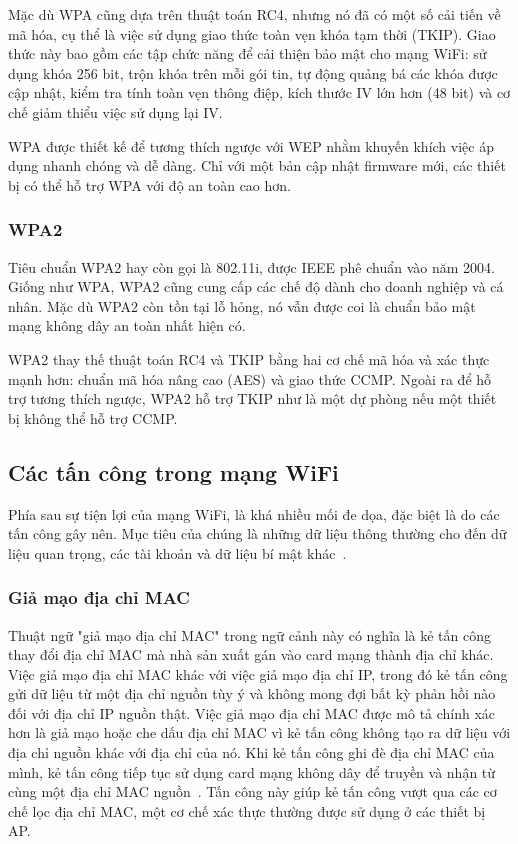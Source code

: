 Mặc dù WPA cũng dựa trên thuật toán RC4, nhưng nó đã có một số cải tiến về mã hóa, cụ thể là việc sử dụng giao thức toàn vẹn khóa tạm thời (TKIP). Giao thức này bao gồm các tập chức năng để cải thiện bảo mật cho mạng WiFi: sử dụng khóa 256 bit, trộn khóa trên mỗi gói tin, tự động quảng bá các khóa được cập nhật, kiểm tra tính toàn vẹn thông điệp, kích thước IV lớn hơn (48 bit) và cơ chế giảm thiểu việc sử dụng lại IV.

WPA được thiết kế để tương thích ngược với WEP nhằm khuyến khích việc áp dụng nhanh chóng và dễ dàng. Chỉ với một bản cập nhật firmware mới, các thiết bị có thể hỗ trợ WPA với độ an toàn cao hơn.

\subsubsection{WPA2}
Tiêu chuẩn WPA2 hay còn gọi là 802.11i, được IEEE phê chuẩn vào năm 2004. Giống như WPA, WPA2 cũng cung cấp các chế độ dành cho doanh nghiệp và cá nhân. Mặc dù WPA2 còn tồn tại lỗ hỏng, nó vẫn được coi là chuẩn bảo mật mạng không dây an toàn nhất hiện có.

WPA2 thay thế thuật toán RC4 và TKIP bằng hai cơ chế mã hóa và xác thực mạnh hơn: chuẩn mã hóa nâng cao (AES) và giao thức CCMP. Ngoài ra để hỗ trợ tương thích ngược, WPA2 hỗ trợ TKIP như là một dự phòng nếu một thiết bị không thể hỗ trợ CCMP.

\subsection{Các tấn công trong mạng WiFi}
Phía sau sự tiện lợi của mạng WiFi, là khá nhiều mối đe dọa, đặc biệt là do các tấn công gây nên. Mục tiêu của chúng là những dữ liệu thông thường cho đến dữ liệu quan trọng, các tài khoản và dữ liệu bí mật khác~\cite{MEKHAZNIA2015172}.

\subsubsection{Giả mạo địa chỉ MAC}
Thuật ngữ "giả mạo địa chỉ MAC" trong ngữ cảnh này có nghĩa là kẻ tấn công thay đổi địa chỉ MAC mà nhà sản xuất gán vào card mạng thành địa chỉ khác. Việc giả mạo địa chỉ MAC khác với việc giả mạo địa chỉ IP, trong đó kẻ tấn công gửi dữ liệu từ một địa chỉ nguồn tùy ý và không mong đợi bất kỳ phản hồi nào đối với địa chỉ IP nguồn thật. Việc giả mạo địa chỉ MAC được mô tả chính xác hơn là giả mạo hoặc che dấu địa chỉ MAC vì kẻ tấn công không tạo ra dữ liệu với địa chỉ nguồn khác với địa chỉ của nó. Khi kẻ tấn công ghi đè địa chỉ MAC của mình, kẻ tấn công tiếp tục sử dụng card mạng không dây để truyền và nhận từ cùng một địa chỉ MAC nguồn~\cite{joshua2003detecting}. Tấn công này giúp kẻ tấn công vượt qua các cơ chế lọc địa chỉ MAC, một cơ chế xác thực thường được sử dụng ở các thiết bị AP.

